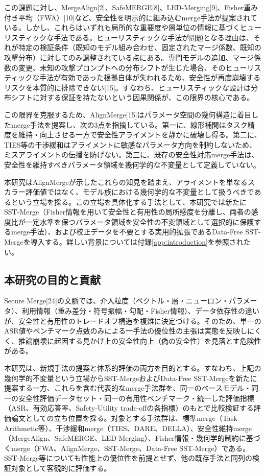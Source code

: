 \documentclass{article}
\begin{document}
この課題に対し、MergeAlign[2]、SafeMERGE[8]、LED-Merging[9]、Fisher重み付き平均（FWA）[10]など、安全性を明示的に組み込むmerge手法が提案されている。しかし、これらはいずれも局所的な重要度や層単位の情報に基づくヒューリスティックな手法である。ヒューリスティックな手法が問題となる理由は、それが特定の検証条件（既知のモデル組み合わせ、固定されたマージ係数、既知の攻撃分布）に対してのみ調整されている点にある。専門モデルの追加、マージ係数の変更、未知の攻撃プロンプトへの分布シフトが生じた場合、そのヒューリスティックな手法が有効であった根拠自体が失われるため、安全性が再度崩壊するリスクを本質的に排除できない[15]。すなわち、ヒューリスティックな設計は分布シフトに対する保証を持たないという因果関係が、この限界の核心である。

この限界を克服するため、AlignMerge[15]はパラメータ空間の幾何構造に着目したmerge手法を提案し、次の3点を指摘している。第一に、線形補間はタスク精度を維持・向上させる一方で安全性アライメントを静かに破壊し得る。第二に、TIES等の干渉緩和はアライメントに敏感なパラメータ方向を制約しないため、ミスアライメントの伝播を防げない。第三に、既存の安全性対応merge手法は、安全性を維持すべきパラメータ領域を幾何学的な不変量として定義していない。

本研究はAlignMergeが示したこれらの知見を踏まえ、アライメントを単なるスカラー評価値ではなく、モデル族における幾何学的な不変量として扱うべきであるという立場を採る。この立場を具体化する手法として、本研究では新たにSST-Merge（Fisher情報を用いて安全性と有用性の局所感度を分離し、両者の感度比が一定水準を保つパラメータ領域を安全性の不変領域として選択的に保護するmerge手法）、および校正データを不要とする実用的拡張であるData-Free SST-Mergeを導入する。詳しい背景については付録\ref{app:introduction}を参照されたい。


\subsection{本研究の目的と貢献}
Secure Merge[24]の文脈では、介入粒度（ベクトル・層・ニューロン・パラメータ）、利用情報（重み差分・符号振幅・勾配・Fisher情報）、データ依存性の違いが、安全性と有用性のトレードオフ構造を複雑に決定づける。そのため、単一のASR値やベンチマーク点数のみによる一手法の優位性の主張は実態を反映しにくく、推論崩壊に起因する見かけ上の安全性向上（偽の安全性）を見落とす危険性がある。

本研究は、新規手法の提案と体系的評価の両方を目的とする。すなわち、上記の幾何学的不変量という立場からSST-MergeおよびData-Free SST-Mergeを新たに提案する一方、これらを含む代表的なmerge手法群を、同一のベースモデル・同一の安全性評価データセット・同一の有用性ベンチマーク・統一した評価指標（ASR、有効応答率、Safety-Utility trade-offの各指標）のもとで比較検証する評価論文としての立ち位置を採る。対象とする手法群は、標準merge（Task Arithmetic等）、干渉緩和merge（TIES、DARE、DELLA）、安全性維持merge（MergeAlign、SafeMERGE、LED-Merging）、Fisher情報・幾何学的制約に基づくmerge（FWA、AlignMerge、SST-Merge、Data-Free SST-Merge）である。SST-Merge等についても性能上の優位性を前提とせず、他の既存手法と同列の検証対象として客観的に評価する。
\end{document}
